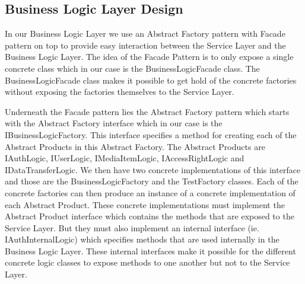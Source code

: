 \documentclass[../report.tex]{subfiles}
\begin{document}
\graphicspath{{img/}{../img/}}

\subsection{Business Logic Layer Design}




In our Business Logic Layer we use an Abstract Factory pattern with Facade pattern on top to provide easy interaction between the Service Layer and the Business Logic Layer. The idea of the Facade Pattern is to only expose a single concrete class which in our case is the BusinessLogicFacade class. The BusinessLogicFacade class makes it possible to get hold of the concrete factories without exposing the factories themselves to the Service Layer.

Underneath the Facade pattern lies the Abstract Factory pattern which starts with the Abstract Factory interface which in our case is the IBusinessLogicFactory. This interface specifies a method for creating each of the Abstract Products in this Abstract Factory. The Abstract Products are IAuthLogic, IUserLogic, IMediaItemLogic, IAccessRightLogic and IDataTransferLogic. We then have two concrete implementations of this interface and those are the BusinessLogicFactory and the TestFactory classes. Each of the concrete factories can then produce an instance of a concrete implementation of each Abstract Product. These concrete implementations must implement the Abstract Product interface which contains the methods that are exposed to the Service Layer. But they must also implement an internal interface (ie. IAuthInternalLogic) which specifies methods that are used internally in the Business Logic Layer. These internal interfaces make it possible for the different concrete logic classes to expose methods to one another but not to the Service Layer.
\end{document}
